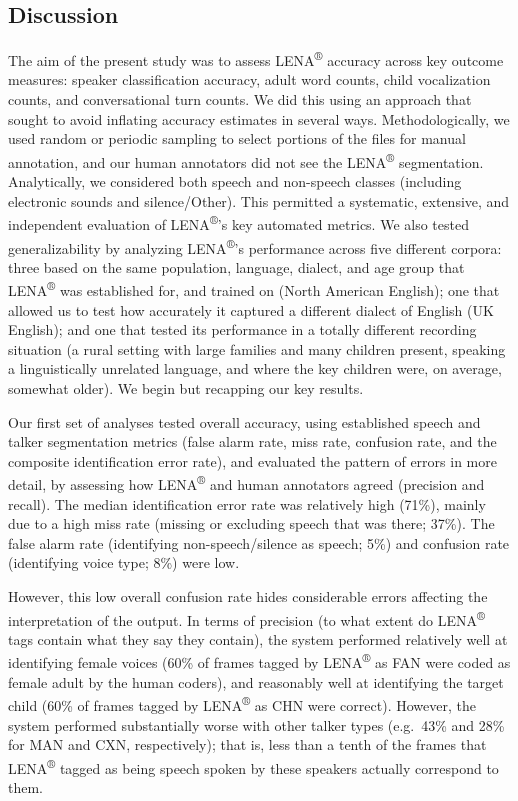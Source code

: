 \documentclass[english,table,man,floatsintext]{apa6}
\begin{document}
\subsection{Discussion}\label{discussion}

The aim of the present study was to assess LENA\textsuperscript{®}
accuracy across key outcome measures: speaker classification accuracy,
adult word counts, child vocalization counts, and conversational turn
counts. We did this using an approach that sought to avoid inflating
accuracy estimates in several ways. Methodologically, we used random or
periodic sampling to select portions of the files for manual annotation,
and our human annotators did not see the LENA\textsuperscript{®}
segmentation. Analytically, we considered both speech and non-speech
classes (including electronic sounds and silence/Other). This permitted
a systematic, extensive, and independent evaluation of
LENA\textsuperscript{®}'s key automated metrics. We also tested
generalizability by analyzing LENA\textsuperscript{®}'s performance
across five different corpora: three based on the same population,
language, dialect, and age group that LENA\textsuperscript{®} was
established for, and trained on (North American English); one that
allowed us to test how accurately it captured a different dialect of
English (UK English); and one that tested its performance in a totally
different recording situation (a rural setting with large families and
many children present, speaking a linguistically unrelated language, and
where the key children were, on average, somewhat older). We begin but
recapping our key results.

Our first set of analyses tested overall accuracy, using established
speech and talker segmentation metrics (false alarm rate, miss rate,
confusion rate, and the composite identification error rate), and
evaluated the pattern of errors in more detail, by assessing how
LENA\textsuperscript{®} and human annotators agreed (precision and
recall). The median identification error rate was relatively high
(71\%), mainly due to a high miss rate (missing or excluding speech that
was there; 37\%). The false alarm rate (identifying non-speech/silence
as speech; 5\%) and confusion rate (identifying voice type; 8\%) were
low.

However, this low overall confusion rate hides considerable errors
affecting the interpretation of the output. In terms of precision (to
what extent do LENA\textsuperscript{®} tags contain what they say they
contain), the system performed relatively well at identifying female
voices (60\% of frames tagged by LENA\textsuperscript{®} as FAN were
coded as female adult by the human coders), and reasonably well at
identifying the target child (60\% of frames tagged by
LENA\textsuperscript{®} as CHN were correct). However, the system
performed substantially worse with other talker types (e.g.~43\% and
28\% for MAN and CXN, respectively); that is, less than a tenth of the
frames that LENA\textsuperscript{®} tagged as being speech spoken by
these speakers actually correspond to them.
\end{document}
